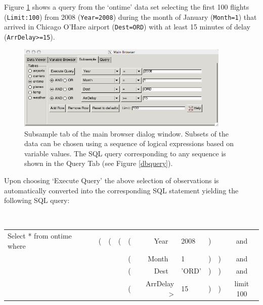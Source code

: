 \documentclass[11pt]{tise_style}
\begin{document}
Figure \ref{dbsample} shows a query from the `ontime' data set selecting the first 100 flights ({\tt{Limit:100}}) from 2008 ({\tt{Year=2008}}) during the month of January ({\tt{Month=1}}) that arrived in Chicago O'Hare airport ({\tt{Dest=ORD}}) with at least 15 minutes of delay ({\tt{ArrDelay>=15}}).  \\[.25cm]

\begin{figure}[htbp] %
   \centering
   \includegraphics[width=4in]{db-sample.png} 
   \caption{Subsample tab of the main browser dialog window. Subsets of the data can be chosen using a sequence of logical expressions based on variable values. The SQL query corresponding to any sequence is shown in the Query Tab (see Figure \ref{dbquery}).}
   \label{dbsample}
\end{figure}

Upon choosing `Execute Query' the above selection of observations is automatically converted into the corresponding SQL statement yielding the following SQL query:

{\tt
\begin{tabular}{lllllr@{=\ }lllc}
 Select * from ontime where & ( & ( & ( & (& Year \  & 2008 &) && and \\
&&& &(& Month \ & 1 & ) & ) & and \\
&&& & (& Dest \ & 'ORD' & )& ) & and \\
&&& & (& ArrDelay > & 15& )& ) & limit 100
\end{tabular}
}

 
\end{document}
